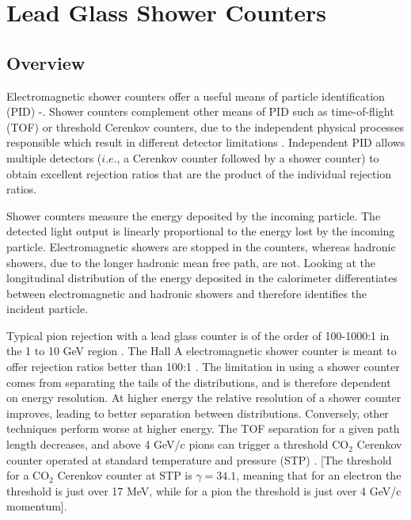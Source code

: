 \section{Lead Glass Shower Counters}
  

\subsection{Overview}

Electromagnetic shower counters offer a useful means of particle
identification (PID) \cite{bartozek}-\cite{appel}. Shower counters
complement other means of PID such as time-of-flight (TOF) or
threshold Cerenkov counters, due to the independent physical processes
responsible which result in different detector
limitations \cite{goldberg}. Independent PID allows multiple detectors
($i.e.$, a Cerenkov counter followed by a shower counter) to obtain
excellent rejection ratios that are the product of the individual
rejection ratios.

Shower counters measure the energy deposited by the incoming particle.  
The detected light output is linearly proportional to the energy lost
by the incoming particle.  Electromagnetic showers are stopped in the 
counters, whereas hadronic showers, due to the longer hadronic mean free 
path, are not.  Looking at the longitudinal distribution of the energy 
deposited in the calorimeter differentiates between electromagnetic and 
hadronic showers and therefore identifies the incident particle.

Typical pion rejection with a lead glass counter is of the order of 
100-1000:1 in the 1 to 10 GeV region \cite{ferbel}.
The Hall A electromagnetic shower counter is meant to offer rejection 
ratios better than 100:1 \cite{CDR}.  
The limitation in using a shower counter comes from separating the tails
of the distributions, and is therefore dependent on energy resolution.
At higher energy the relative resolution of a shower counter improves, leading
to better separation between distributions.  Conversely, other techniques
perform worse at higher energy.  
The TOF separation for a given path length decreases, and above 4 GeV/c pions
can trigger a threshold CO$_2$ Cerenkov counter operated at standard 
temperature and pressure (STP) \cite{ferbel}. 
[The threshold for a CO$_2$ Cerenkov counter at STP is $\gamma=34.1$, meaning 
that for an electron the threshold is just over 17 MeV, while for a pion the
threshold is just over 4 GeV/c momentum].

